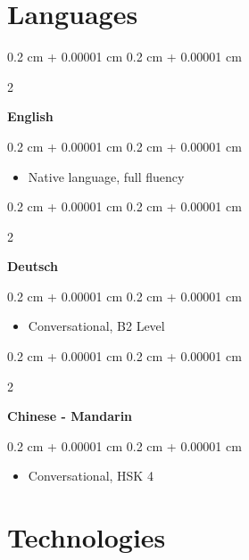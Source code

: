 \documentclass[10pt, letterpaper]{article}
\newenvironment{highlights}{
    \begin{itemize}[
        topsep=0.10 cm,
        parsep=0.10 cm,
        partopsep=0pt,
        itemsep=0pt,
        leftmargin=0.4 cm + 10pt
    ]
}{
    \end{itemize}
} %
\newenvironment{onecolentry}{
    \begin{adjustwidth}{
        0.2 cm + 0.00001 cm
    }{
        0.2 cm + 0.00001 cm
    }
}{
    \end{adjustwidth}
} %
\newenvironment{twocolentry}[2][]{
    \onecolentry
    \def\secondColumn{#2}
    \setcolumnwidth{\fill, 4.5 cm}
    \begin{paracol}{2}
}{
    \switchcolumn \raggedleft \secondColumn
    \end{paracol}
    \endonecolentry
} %
\begin{document}
        \section{Languages}
        
        \begin{twocolentry}{}
            \textbf{English}
        \end{twocolentry}

        \vspace{0.20 cm}
        \begin{onecolentry}
            \begin{highlights}
                \item Native language, full fluency
            \end{highlights}
        \end{onecolentry}


        \vspace{0.3 cm}

        \begin{twocolentry}{}
            \textbf{Deutsch}
        \end{twocolentry}

        \vspace{0.10 cm}
        \begin{onecolentry}
            \begin{highlights}
                \item Conversational, B2 Level
            \end{highlights}
        \end{onecolentry}

        \vspace{0.3 cm}

        \begin{twocolentry}{}
            \textbf{Chinese - Mandarin}
        \end{twocolentry}

        \vspace{0.10 cm}
        \begin{onecolentry}
            \begin{highlights}
                \item Conversational, HSK 4
            \end{highlights}
        \end{onecolentry}

    \section{Technologies}
\end{document}

